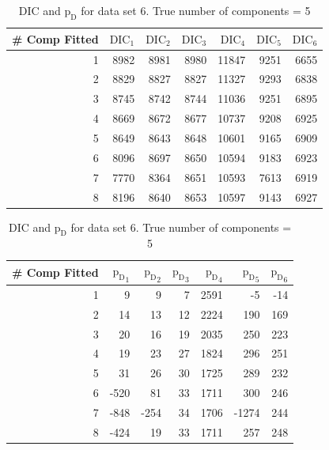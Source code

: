 \begin{table}[!htb]
\centering
\captionsetup{justification=centering}
\caption{DIC and $\text{p}_\text{D}$ for data set 6. True number of components = 5}
\label{table : ds_5wellsep_dic}
\begin{tabular}{@{}rrrrrrr@{}}
\toprule
\# Comp Fitted & $\text{DIC}_1$ & $\text{DIC}_2$  & $\text{DIC}_3$  & $\text{DIC}_4$  & $\text{DIC}_5$  & $\text{DIC}_6$  \\ \midrule
1 & 8982 & 8981 & 8980 & 11847 & 9251 & 6655 \\
2 & 8829 & 8827 & 8827 & 11327 & 9293 & 6838 \\
3 & 8745 & 8742 & 8744 & 11036 & 9251 & 6895 \\
4 & 8669 & 8672 & 8677 & 10737 & 9208 & 6925 \\
5 & 8649 & 8643 & 8648 & 10601 & 9165 & 6909 \\
6 & 8096 & 8697 & 8650 & 10594 & 9183 & 6923 \\
7 & 7770 & 8364 & 8651 & 10593 & 7613 & 6919 \\
8 & 8196 & 8640 & 8653 & 10597 & 9143 & 6927 \\ \bottomrule
\end{tabular}

\begin{tabular}{@{}rrrrrrr@{}}
\toprule
\# Comp Fitted & ${\text{p}_\text{D}}_1$ & ${\text{p}_\text{D}}_2$ & ${\text{p}_\text{D}}_3$ & ${\text{p}_\text{D}}_4$ & ${\text{p}_\text{D}}_5$ & ${\text{p}_\text{D}}_6$ \\ \midrule
1 & 9 & 9 & 7 & 2591 & -5 & -14 \\
2 & 14 & 13 & 12 & 2224 & 190 & 169 \\
3 & 20 & 16 & 19 & 2035 & 250 & 223 \\
4 & 19 & 23 & 27 & 1824 & 296 & 251 \\
5 & 31 & 26 & 30 & 1725 & 289 & 232 \\
6 & -520 & 81 & 33 & 1711 & 300 & 246 \\
7 & -848 & -254 & 34 & 1706 & -1274 & 244 \\
8 & -424 & 19 & 33 & 1711 & 257 & 248 \\ \bottomrule
\end{tabular}
\end{table}

